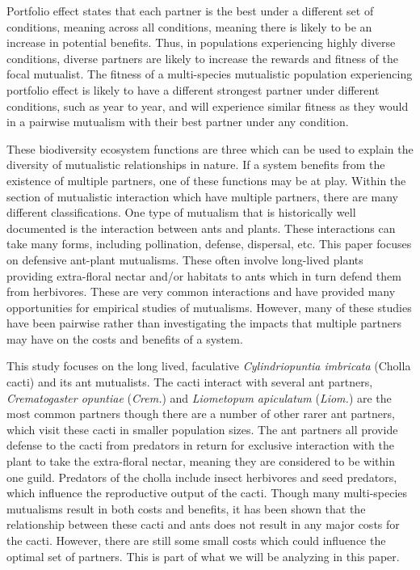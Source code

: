 \documentclass[12pt,a4paper]{article}
\begin{document}
Portfolio effect states that each partner is the best under a different set of conditions, meaning across all conditions, meaning there is likely to be an increase in potential benefits\cite{Winfree2020}. Thus, in populations experiencing highly diverse conditions, diverse partners are likely to increase the rewards and fitness of the focal mutualist. The fitness of a multi-species mutualistic population experiencing portfolio effect is likely to have a different strongest partner under different conditions, such as year to year, and will experience similar fitness as they would in a pairwise mutualism with their best partner under any condition.  

These biodiversity ecosystem functions are three which can be used to explain the diversity of mutualistic relationships in nature\cite{Afkhami2014}. If a system benefits from the existence of multiple partners, one of these functions may be at play. Within the section of mutualistic interaction which have multiple partners, there are many different classifications. One type of mutualism that is historically well documented is the interaction between ants and plants\cite{Boege2005,Barton2010}. These interactions can take many forms, including pollination, defense, dispersal, etc\cite{Bronstein2006}. This paper focuses on defensive ant-plant mutualisms. These often involve long-lived plants providing extra-floral nectar and/or habitats to ants which in turn defend them from herbivores\cite{Bronstein1998}.  These are very common interactions and have provided many opportunities for empirical studies of mutualisms. However, many of these studies have been pairwise rather than investigating the impacts that multiple partners may have on the costs and benefits of a system. 

This study focuses on the long lived, faculative \textit{Cylindriopuntia imbricata} (Cholla cacti) and its ant mutualists. The cacti interact with several ant partners, \textit{Crematogaster opuntiae} (\textit{Crem.}) and \textit{Liometopum apiculatum} (\textit{Liom.}) are the most common partners though there are a number of other rarer ant partners, which visit these cacti in smaller population sizes. The ant partners all provide defense to the cacti from predators in return for exclusive interaction with the plant to take the extra-floral nectar, meaning they are considered to be within one guild. Predators of the cholla include insect herbivores and seed predators, which influence the reproductive output of the cacti. Though many multi-species mutualisms result in both costs and benefits, it has been shown that the relationship between these cacti and ants does not result in any major costs for the cacti\cite{Miller2007}. However, there are still some small costs which could influence the optimal set of partners. This is part of what we will be analyzing in this paper.
\end{document}
